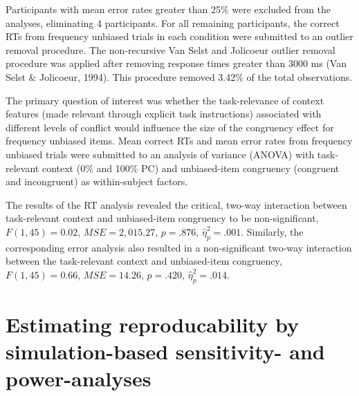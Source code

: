 \documentclass[english,,man,floatsintext]{apa6}
\begin{document}
Participants with mean error rates greater than 25\% were excluded from the analyses, eliminating 4 participants. For all remaining participants, the correct RTs from frequency unbiased trials in each condition were submitted to an outlier removal procedure. The non-recursive Van Selst and Jolicoeur outlier removal procedure was applied after removing response times greater than 3000 ms (Van Selst \& Jolicoeur, 1994). This procedure removed 3.42\% of the total observations.

The primary question of interest was whether the task-relevance of context features (made relevant through explicit task instructions) associated with different levels of conflict would influence the size of the congruency effect for frequency unbiased items. Mean correct RTs and mean error rates from frequency unbiased trials were submitted to an analysis of variance (ANOVA) with task-relevant context (0\% and 100\% PC) and unbiased-item congruency (congruent and incongruent) as within-subject factors.

The results of the RT analysis revealed the critical, two-way interaction between task-relevant context and unbiased-item congruency to be non-significant, \(F(1, 45) = 0.02\), \(\mathit{MSE} = 2,015.27\), \(p = .876\), \(\hat{\eta}^2_p = .001\). Similarly, the corresponding error analysis also resulted in a non-significant two-way interaction between the task-relevant context and unbiased-item congruency, \(F(1, 45) = 0.66\), \(\mathit{MSE} = 14.26\), \(p = .420\), \(\hat{\eta}^2_p = .014\).

\hypertarget{estimating-reproducability-by-simulation-based-sensitivity--and-power-analyses}{%
\section{Estimating reproducability by simulation-based sensitivity- and power-analyses}\label{estimating-reproducability-by-simulation-based-sensitivity--and-power-analyses}}
\end{document}
